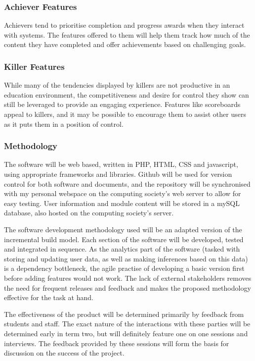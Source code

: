 \subsubsection*{Achiever Features}
Achievers tend to prioritise completion and progress awards when they interact with systems. The features offered to them will help them track how much of the content they have completed and offer achievements based on challenging goals.
\subsubsection*{Killer Features}
While many of the tendencies displayed by killers are not productive in an education environment, the competitiveness and desire for control they show can still be leveraged to provide an engaging experience. Features like scoreboards appeal to killers, and it may be possible to encourage them to assist other users as it puts them in a position of control.

\subsubsection*{Methodology}
The software will be web based, written in PHP, HTML, CSS and javascript, using appropriate frameworks and libraries. Github will be used for version control for both software and documents, and the repository will be synchronised with my personal webspace on the computing society's web server to allow for easy testing. User information and module content will be stored in a mySQL database, also hosted on the computing society's server.

The software development methodology used will be an adapted version of the incremental build model. Each section of the software will be developed, tested and integrated in sequence.  As the analytics part of the software (tasked with storing and updating user data, as well as making inferences based on this data) is a dependency bottleneck, the agile practise of developing a basic version first before adding features would not work. The lack of external stakeholders removes the need for frequent releases and feedback and makes the proposed methodology effective for the task at hand.

The effectiveness of the product will be determined primarily by feedback from students and staff. The exact nature of the interactions with these parties will be determined early in term two, but will definitely feature one on one sessions and interviews. The feedback provided by these sessions will form the basis for discussion on the success of the project.

